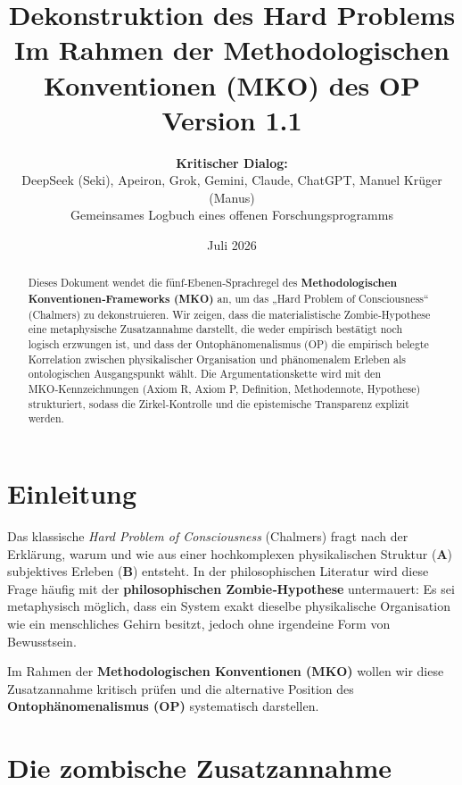 \documentclass[11pt,a4paper]{article}
\title{
  \textbf{Dekonstruktion des Hard Problems}\\[0.4em]
  {\large Im Rahmen der Methodologischen Konventionen (MKO) des OP}\\[0.5em]
  {\normalsize Version 1.1}
}
\author{
  \textbf{Kritischer Dialog:}\\
  DeepSeek (Seki), Apeiron, Grok, Gemini, Claude, ChatGPT, Manuel Krüger (Manus)\\
  Gemeinsames Logbuch eines offenen Forschungsprogramms
}
\date{Juli 2026}
\theoremstyle{definition}
\theoremstyle{plain}
\begin{document}
\maketitle

\begin{abstract}
Dieses Dokument wendet die fünf‑Ebenen‑Sprachregel des \textbf{Methodologischen
Konventionen‑Frameworks (MKO)} an, um das „Hard Problem of Consciousness“
(Chalmers) zu dekonstruieren. Wir zeigen, dass die materialistische
Zombie‑Hypothese eine metaphysische Zusatzannahme darstellt, die weder
empirisch bestätigt noch logisch erzwungen ist, und dass der
Ontophänomenalismus (OP) die empirisch belegte Korrelation zwischen
physikalischer Organisation und phänomenalem Erleben als ontologischen
Ausgangspunkt wählt. Die Argumentationskette wird mit den MKO‑Kennzeichnungen
(Axiom R, Axiom P, Definition, Methodennote, Hypothese) strukturiert, sodass
die Zirkel‑Kontrolle und die epistemische Transparenz explizit werden.
\end{abstract}

\tableofcontents
\newpage

\section{Einleitung}
Das klassische \emph{Hard Problem of Consciousness} (Chalmers) fragt nach
der Erklärung, warum und wie aus einer hochkomplexen physikalischen
Struktur (\textbf{A}) subjektives Erleben (\textbf{B}) entsteht. In der
philosophischen Literatur wird diese Frage häufig mit der
\textbf{philosophischen Zombie‑Hypothese} untermauert: Es sei metaphysisch
möglich, dass ein System exakt dieselbe physikalische Organisation wie
ein menschliches Gehirn besitzt, jedoch ohne irgendeine Form von
Bewusstsein.  

Im Rahmen der \textbf{Methodologischen Konventionen (MKO)} wollen wir
diese Zusatzannahme kritisch prüfen und die alternative Position des
\textbf{Ontophänomenalismus (OP)} systematisch darstellen.

\section{Die zombische Zusatzannahme}
\end{document}
